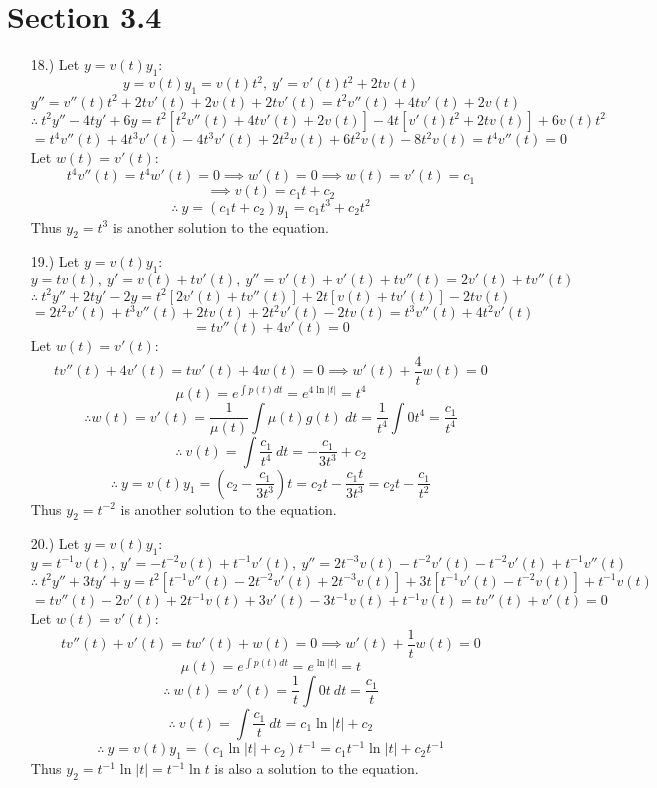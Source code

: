 \documentclass[12pt]{article}
\newcommand{\bracks}[1]{\left[#1\right]}
\newcommand{\parns}[1]{\left(#1\right)}
\begin{document}
\section*{Section 3.4}
\begin{itemize}
    \item [18.)] Let $y=v(t)y_1$:
    \[y=v(t)y_1=v(t)t^2,\ y'=v'(t)t^2+2tv(t)\]
    \[y''=v''(t)t^2+2tv'(t)+2v(t)+2tv'(t)=t^2v''(t)+4tv'(t)+2v(t)\]
    \[\therefore\ t^2y''-4ty'+6y=t^2\bracks{t^2v''(t)+4tv'(t)+2v(t)}-4t\bracks{v'(t)t^2+2tv(t)}+6v(t)t^2\]
    \[=t^4v''(t)+4t^3v'(t)-4t^3v'(t)+2t^2v(t)+6t^2v(t)-8t^2v(t)=t^4v''(t)=0\]
    Let $w(t)=v'(t)$:
    \[t^4v''(t)=t^4w'(t)=0\implies w'(t)=0\implies w(t)=v'(t)=c_1\]
    \[\implies v(t)=c_1t+c_2\]
    \[\therefore\ y=(c_1t+c_2)y_1=c_1t^3+c_2t^2\]
    Thus $y_2=t^3$ is another solution to the equation.

    \item [19.)] Let $y=v(t)y_1$:
    \[y=tv(t),\ y'=v(t)+tv'(t),\ y''=v'(t)+v'(t)+tv''(t)=2v'(t)+tv''(t)\]
    \[\therefore\ t^2y''+2ty'-2y=t^2\bracks{2v'(t)+tv''(t)}+2t\bracks{v(t)+tv'(t)}-2tv(t)\]
    \[=2t^2v'(t)+t^3v''(t)+2tv(t)+2t^2v'(t)-2tv(t)=t^3v''(t)+4t^2v'(t)\]
    \[=tv''(t)+4v'(t)=0\]
    Let $w(t)=v'(t)$:
    \[tv''(t)+4v'(t)=tw'(t)+4w(t)=0\implies w'(t)+\frac{4}{t}w(t)=0\]
    \[\mu(t)=e^{\int p(t)dt}=e^{4\ln\vert t\vert}=t^4\]
    \[\therefore w(t)=v'(t)=\frac{1}{\mu(t)}\int \mu(t)g(t)\ dt=\frac{1}{t^4}\int 0t^4=\frac{c_1}{t^4}\]
    \[\therefore\ v(t)=\int\frac{c_1}{t^4}\ dt=-\frac{c_1}{3t^3}+c_2\]
    \[\therefore\ y=v(t)y_1=\parns{c_2-\frac{c_1}{3t^3}}t=c_2t-\frac{c_1t}{3t^3}=c_2t-\frac{c_1}{t^2}\]
    Thus $y_2=t^{-2}$ is another solution to the equation.
    
    \pagebreak
    \item [20.)] Let $y=v(t)y_1$:
    \[y=t^{-1}v(t),\ y'=-t^{-2}v(t)+t^{-1}v'(t),\ y''=2t^{-3}v(t)-t^{-2}v'(t)-t^{-2}v'(t)+t^{-1}v''(t)\]
    \[\therefore\ t^2y''+3ty'+y=t^2\bracks{t^{-1}v''(t)-2t^{-2}v'(t)+2t^{-3}v(t)}+3t\bracks{t^{-1}v'(t)-t^{-2}v(t)}+t^{-1}v(t)\]
    \[=tv''(t)-2v'(t)+2t^{-1}v(t)+3v'(t)-3t^{-1}v(t)+t^{-1}v(t)=tv''(t)+v'(t)=0\]
    Let $w(t)=v'(t)$:
    \[tv''(t)+v'(t)=tw'(t)+w(t)=0\implies w'(t)+\frac{1}{t}w(t)=0\]
    \[\mu(t)=e^{\int p(t)dt}=e^{\ln\vert t\vert}=t\]
    \[\therefore\ w(t)=v'(t)=\frac{1}{t}\int0t\ dt=\frac{c_1}{t}\]
    \[\therefore\ v(t)=\int\frac{c_1}{t}\ dt=c_1\ln\vert t\vert+c_2\]
    \[\therefore\ y=v(t)y_1=\parns{c_1\ln\vert t\vert+c_2}t^{-1}=c_1t^{-1}\ln\vert t\vert+c_2t^{-1}\]
    Thus $y_2=t^{-1}\ln\vert t\vert=t^{-1}\ln t$ is also a solution to the equation.
\end{itemize}
\end{document}
